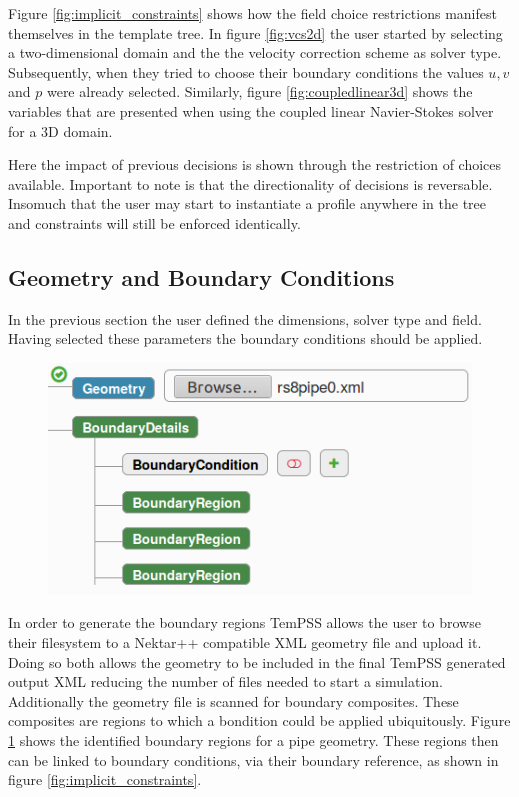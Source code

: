 \documentclass[11pt, a4paper]{report}
\begin{document}
Figure \ref{fig:implicit_constraints} shows how the field choice restrictions manifest themselves in the template tree. In figure \ref{fig:vcs2d} the user started by selecting a two-dimensional domain and the the velocity correction scheme as solver type. Subsequently, when they tried to choose their boundary conditions the values $u, v$ and $p$ were already selected. Similarly, figure \ref{fig:coupledlinear3d} shows the variables that are presented when using the coupled linear Navier-Stokes solver for a 3D domain.

Here the impact of previous decisions is shown through the restriction of choices available. Important to note is that the directionality of decisions is reversable. Insomuch that the user may start to instantiate a profile anywhere in the tree and constraints will still be enforced identically.

\subsection{Geometry and Boundary Conditions}
In the previous section the user defined the dimensions, solver type and field. Having selected these parameters the boundary conditions should be applied.

\begin{figure}[htb!]
 \centering
 \includegraphics[width=.55\linewidth,  clip=true, trim = 0cm 0cm 0cm 0cm]{geometry_upload}
 \label{fig:geometry_upload}
\end{figure}

In order to generate the boundary regions TemPSS allows the user to browse their filesystem to a Nektar++ compatible XML geometry file and upload it. Doing so both allows the geometry to be included in the final TemPSS generated output XML reducing the number of files needed to start a simulation. Additionally the geometry file is scanned for boundary composites. These composites are regions to which a bondition could be applied ubiquitously. Figure \ref{fig:geometry_upload} shows the identified boundary regions for a pipe geometry. These regions then can be linked to boundary conditions, via their boundary reference, as shown in figure \ref{fig:implicit_constraints}.
\end{document}
